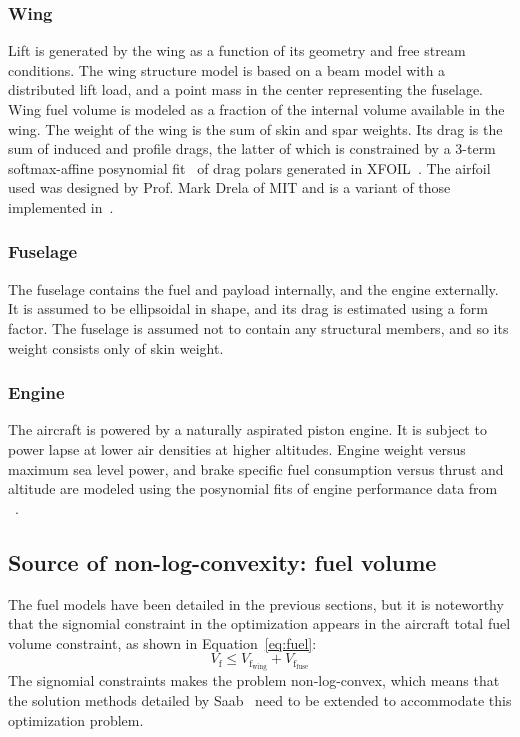 \subsubsection{Wing}

Lift is generated by the wing as a function of its geometry and free stream conditions.
The wing structure model is based on a beam model with a distributed lift load,
and a point mass in the center representing the fuselage.
Wing fuel volume is modeled as a fraction of the internal volume available in the wing.
The weight of the wing is the sum of skin and spar weights.
{\color{blue}Its drag is the sum of induced and profile drags, the latter of which is
constrained by a 3-term softmax-affine posynomial fit~\cite{Hoburg2016} of drag polars
generated in XFOIL~\cite{XFOIL}.
The airfoil used was designed by Prof. Mark Drela of MIT and
is a variant of those implemented in~\cite{Burton2018}.}

\subsubsection{Fuselage}

The fuselage contains the fuel and payload internally, and the engine externally.
It is assumed to be ellipsoidal in shape, and its drag is estimated using a form factor.
The fuselage is assumed not to contain any structural members, and so its weight consists only of skin weight.

\subsubsection{Engine}

The aircraft is powered by a naturally aspirated piston engine. It is subject to
power lapse at lower air densities at higher altitudes. {\color{blue}Engine weight versus maximum sea level power,
and brake specific fuel consumption versus thrust and altitude
are modeled using the posynomial fits of engine performance data from ~\cite{Ozturk2017}.}

\subsection{Source of non-log-convexity: fuel volume}
The fuel models have been detailed in the previous sections, but it is noteworthy that
the signomial constraint in the optimization appears in the aircraft total fuel volume constraint,
as shown in Equation~\ref{eq:fuel}:
\begin{equation}
\label{eq:fuel}
V_{\mathrm{f}} \leq V_{\mathrm{f_{wing}}} + V_{\mathrm{f_{fuse}}}
\end{equation}
The signomial constraints makes the problem non-log-convex, which means that the solution methods
detailed by Saab~\cite{Saab2018} need to be extended to accommodate this optimization problem.
